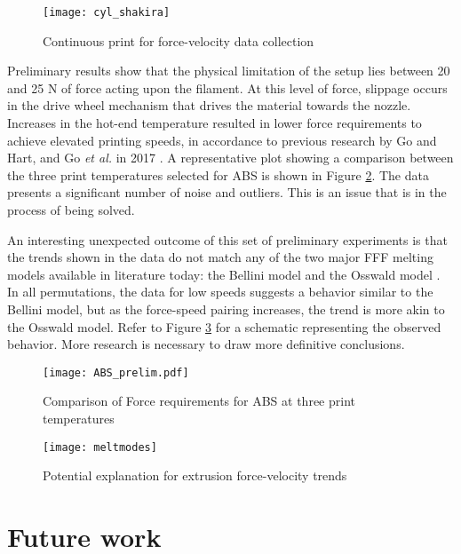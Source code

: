 \documentclass[main.tex]{subfiles}
\begin{document}
\begin{figure}[!htbp]
	\center
	\texttt{[image: cyl\_shakira]}
	\caption{Continuous print for force-velocity data collection} \label{fig:cyl}
\end{figure}

Preliminary results show that the physical limitation of the setup lies between 20 and 25 N of force acting upon the filament. At this level of force, slippage occurs in the drive wheel mechanism that drives the material towards the nozzle.  Increases in the hot-end temperature resulted in lower force requirements to achieve elevated printing speeds, in accordance to previous research by Go and Hart, and Go \emph{et al.} in 2017 \cite{Go2017a, Go2017}. A representative plot showing a comparison between the three print temperatures selected for ABS is shown in Figure \ref{fig:absprelim}. The data presents a significant number of noise and outliers. This is an issue that is in the process of being solved.

An interesting unexpected outcome of this set of preliminary experiments is that the trends shown in the data do not match any of the two major FFF melting models available in literature today: the Bellini model and the Osswald model \cite{Bellini2004, OsswaldMelting18}. In all permutations, the data for low speeds suggests a behavior similar to the Bellini model, but as the force-speed pairing increases, the trend is more akin to the Osswald model. Refer to Figure \ref{fig:meltmodes} for a schematic representing the observed behavior. More research is necessary to draw more definitive conclusions.

\pagebreak

\begin{figure}[!htbp]
	\center
	\texttt{[image: ABS\_prelim.pdf]}
	\caption{Comparison of Force requirements for ABS at three print temperatures} \label{fig:absprelim}
\end{figure}

\begin{figure}[!htbp]
	\center
	\texttt{[image: meltmodes]}
	\caption{Potential explanation for extrusion force-velocity trends} \label{fig:meltmodes}
\end{figure}

\section{Future work} \label{sec:fw}
\end{document}
